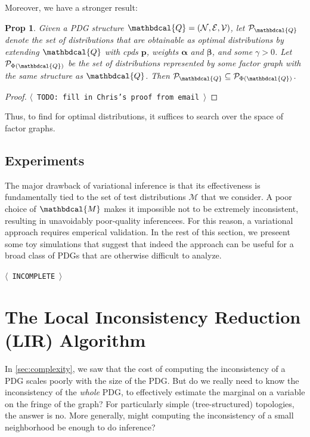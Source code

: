 \documentclass{article}
\theoremstyle{plain}
\newtheorem{prop}[theorem]{Prop}
\theoremstyle{definition}
\theoremstyle{remark}
\newcommand{\TODO}[1][INCOMPLETE]{{\centering\Large\color{red}$\langle$~\texttt{#1}~$\rangle$\par}}
\newcommand\mat[1]{\mathbf{#1}}
\newcommand{\bp}[1][L]{\mat{p}_{\!_{#1}\!}}
\newcommand{\V}{\mathcal V}
\newcommand{\N}{\mathcal N}
\newcommand{\Ed}{\mathcal E}
\newcommand{\dg}[1]{\mathbdcal{#1}}
\begin{document}
Moreover, we have a stronger result:

\begin{prop}
	Given a PDG structure $\dg Q = (\N, \Ed, \V)$, let $\mathcal P_{\dg Q}$ denote the set of distributions that are obtainable as optimal distributions by extending $\dg Q$ with cpds $\mat p$, weights $\boldsymbol\alpha$ and $\boldsymbol\beta$, and some $\gamma > 0$. 
	Let $\mathcal P_{\Phi(\dg Q)}$ be the set of distributions represented by some factor graph with the same structure as $\dg Q$. 
	Then $\mathcal P_{\dg Q} \subseteq \mathcal P_{\Phi(\dg Q)}$. 
\end{prop}
\begin{proof}
	\TODO[TODO: fill in Chris's proof from email]
\end{proof}

Thus, to find for optimal distributions, it suffices to search over the space of factor graphs. 






\subsection{Experiments}
	\label{sec:experiment-variational}

The major drawback of variational inference is that its effectiveness is fundamentally tied to the set of test distributions $\mathcal M$ that we consider.
A poor choice of $\dg M$ makes it impossible not to be extremely inconsistent, resulting in unavoidably poor-quality inferencees.
For this reason, a variational approach requires emperical validation. In the rest of this section, we preseent some toy simulations that suggest that indeed the approach can be useful for a broad class of PDGs that are otherwise difficult to analyze.

\TODO

\section{The Local Inconsistency Reduction (LIR) Algorithm}
% 

In \cref{sec:complexity}, we saw that the cost of computing the inconsistency of a PDG scales poorly with the size of the PDG.
But do we really need to know the inconsistency of the \emph{whole} PDG, to effectively estimate the marginal on a variable on the fringe of the graph? For particularly simple (tree-structured) topologies, the answer is no. More generally, might computing the inconsistency of a small neighborhood be enough to do inference?
\end{document}
